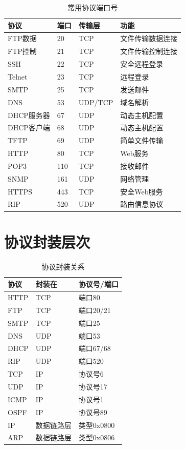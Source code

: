 \begin{table}[htbp]
\centering
\begin{tabular}{llll}
\toprule
\textbf{协议} & \textbf{端口} & \textbf{传输层} & \textbf{功能} \\
\midrule
FTP数据 & 20 & TCP & 文件传输数据连接 \\
FTP控制 & 21 & TCP & 文件传输控制连接 \\
SSH & 22 & TCP & 安全远程登录 \\
Telnet & 23 & TCP & 远程登录 \\
SMTP & 25 & TCP & 发送邮件 \\
DNS & 53 & UDP/TCP & 域名解析 \\
DHCP服务器 & 67 & UDP & 动态主机配置 \\
DHCP客户端 & 68 & UDP & 动态主机配置 \\
TFTP & 69 & UDP & 简单文件传输 \\
HTTP & 80 & TCP & Web服务 \\
POP3 & 110 & TCP & 接收邮件 \\
SNMP & 161 & UDP & 网络管理 \\
HTTPS & 443 & TCP & 安全Web服务 \\
RIP & 520 & UDP & 路由信息协议 \\
\bottomrule
\end{tabular}
\caption{常用协议端口号}
\end{table}

\section{协议封装层次}

\begin{table}[htbp]
\centering
\begin{tabular}{lll}
\toprule
\textbf{协议} & \textbf{封装在} & \textbf{协议号/端口} \\
\midrule
HTTP & TCP & 端口80 \\
FTP & TCP & 端口20/21 \\
SMTP & TCP & 端口25 \\
DNS & UDP & 端口53 \\
DHCP & UDP & 端口67/68 \\
RIP & UDP & 端口520 \\
TCP & IP & 协议号6 \\
UDP & IP & 协议号17 \\
ICMP & IP & 协议号1 \\
OSPF & IP & 协议号89 \\
IP & 数据链路层 & 类型0x0800 \\
ARP & 数据链路层 & 类型0x0806 \\
\bottomrule
\end{tabular}
\caption{协议封装关系}
\end{table}

